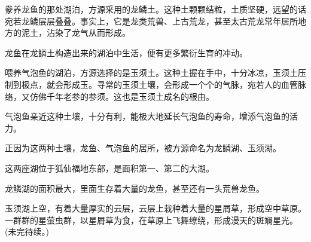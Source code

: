 \begin{this_body}
豢养龙鱼的那处湖泊，方源采用的龙鳞土。这种土颗颗结粒，土质坚硬，远望的话宛若龙鳞层层叠叠。事实上，它是龙类荒兽、上古荒龙，甚至太古荒龙常年居所地方的泥土，沾染了龙气从而形成。

龙鱼在龙鳞土构造出来的湖泊中生活，便有更多繁衍生育的冲动。

喂养气泡鱼的湖泊，方源选择的是玉须土。这种土握在手中，十分冰凉，玉须土压制到极点，就会形成玉。寻常的玉须土壤，会形成一个个的气脉，宛若人的血管脉络，又仿佛千年老参的参须。这也是玉须土成名的根由。

气泡鱼亲近这种土壤，十分有利，能极大地延长气泡鱼的寿命，增添气泡鱼的活力。

正因为这两种土壤，龙鱼、气泡鱼的居所，被方源命名为龙鳞湖、玉须湖。

这两座湖位于狐仙福地东部，是面积第一、第二的大湖。

龙鳞湖的面积最大，里面生存着大量的龙鱼，甚至还有一头荒兽龙鱼。

玉须湖上空，有着大量厚实的云层，云层上栽种着大量的星屑草，形成空中草原。一群群的星萤虫群，以星屑草为食，在草原上飞舞缭绕，形成漫天的斑斓星光。(未完待续。)

\end{this_body}

